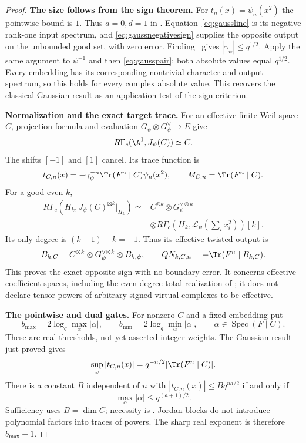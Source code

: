 \begin{proof}
\par\smallskip\noindent\textbf{The size follows from the sign theorem.}\quad
For $t_n(x)=\psi_n(x^2)$ the pointwise bound is $1$.
Thus $a=0,d=1$ in .
Equation~\eqref{eq:gaussline} is its negative rank-one
input spectrum, and \eqref{eq:gaussnegativesign} supplies
the opposite output on the unbounded good set, with zero
error. Finding~ gives $|\gamma_\psi|\le q^{1/2}$.
Apply the same argument to $\psi^{-1}$ and then
\eqref{eq:gausspair}: both absolute values equal $q^{1/2}$.
Every embedding has its corresponding nontrivial character
and output spectrum, so this holds for every complex
absolute value. This recovers the classical Gaussian
result as an application test of the sign criterion.

\par\smallskip\noindent\textbf{Normalization and the exact target trace.}\quad
For an effective finite Weil space $C$, projection formula
and evaluation $G_\psi\otimes G_\psi^\vee\to E$ give
\[
 R\Gamma_c(\A^1,J_\psi(C))\simeq C.
\]
The shifts $[-1]$ and $[1]$ cancel. Its trace function is
\begin{equation}\label{eq:gaussnormalizedtrace}
 t_{C,n}(x)=-\gamma_\psi^{-n}
            \Tr(F^n\mid C)\psi_n(x^2),
 \qquad M_{C,n}=\Tr(F^n\mid C).
\end{equation}
For a good even $k$,
\begin{align*}
 R\Gamma_c(H_k,J_\psi(C)^{\boxtimes k}|_{H_k})
 \simeq{}&C^{\otimes k}\otimes G_\psi^{\vee\otimes k}\\
 &\otimes
 R\Gamma_c(H_k,\mathcal L_\psi(\textstyle\sum_i x_i^2))[k].
\end{align*}
Its only degree is $(k-1)-k=-1$. Thus its effective
twisted output is
\[
 B_{k,C}=C^{\otimes k}\otimes
                    G_\psi^{\vee\otimes k}\otimes B_{k,\psi},
 \qquad
 QN_{k,C,n}=-\Tr(F^n\mid B_{k,C}).
\]
This proves the exact opposite sign with no boundary error.
It concerns effective coefficient spaces, including the
even-degree total realization of ; it does not
declare tensor powers of arbitrary signed virtual complexes
to be effective.

\par\smallskip\noindent\textbf{The pointwise and dual gates.}\quad
For nonzero $C$ and a fixed embedding put
\[
 b_{\max}=2\log_q\max_\alpha|\alpha|,\qquad
 b_{\min}=2\log_q\min_\alpha|\alpha|,
 \qquad \alpha\in\operatorname{Spec}(F\mid C).
\]
These are real thresholds, not yet asserted integer weights.
The Gaussian result just proved gives
\[
 \sup_x|t_{C,n}(x)|
       =q^{-n/2}|\Tr(F^n\mid C)|.
\]
There is a constant $B$ independent of $n$ with
$|t_{C,n}(x)|\le Bq^{na/2}$ if and only if
\begin{equation}\label{eq:gausspointwisegate}
 \max_\alpha|\alpha|\le q^{(a+1)/2}.
\end{equation}
Sufficiency uses $B=\dim C$; necessity is .
Jordan blocks do not introduce polynomial factors into
traces of powers. The sharp real exponent is therefore
$b_{\max}-1$.


\end{proof}
